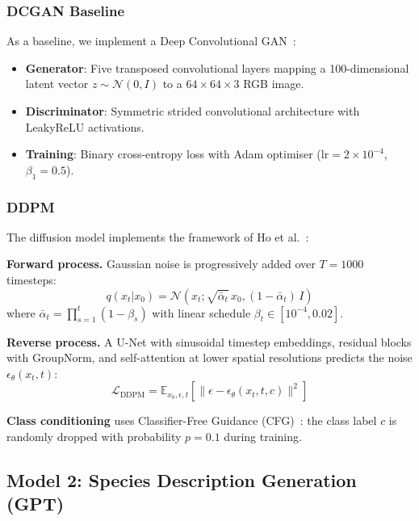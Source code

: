 \documentclass[12pt,a4paper]{article}
\begin{document}
\subsubsection{DCGAN Baseline}

As a baseline, we implement a Deep Convolutional GAN~\cite{radford2015unsupervised}:
\begin{itemize}
    \item \textbf{Generator}: Five transposed convolutional layers mapping a 100-dimensional latent vector $z \sim \mathcal{N}(0, I)$ to a $64 \times 64 \times 3$ RGB image.
    \item \textbf{Discriminator}: Symmetric strided convolutional architecture with LeakyReLU activations.
    \item \textbf{Training}: Binary cross-entropy loss with Adam optimiser ($\text{lr}=2\times10^{-4}$, $\beta_1=0.5$).
\end{itemize}

\subsubsection{DDPM}

The diffusion model implements the framework of Ho et al.~\cite{ho2020denoising}:

\textbf{Forward process.} Gaussian noise is progressively added over $T=1000$ timesteps:
\begin{equation}
    q(x_t | x_0) = \mathcal{N}(x_t; \sqrt{\bar{\alpha}_t}\, x_0, (1-\bar{\alpha}_t)\, I)
\end{equation}
where $\bar{\alpha}_t = \prod_{s=1}^{t}(1 - \beta_s)$ with linear schedule $\beta_t \in [10^{-4}, 0.02]$.

\textbf{Reverse process.} A U-Net with sinusoidal timestep embeddings, residual blocks with GroupNorm, and self-attention at lower spatial resolutions predicts the noise $\epsilon_\theta(x_t, t)$:
\begin{equation}
    \mathcal{L}_{\text{DDPM}} = \mathbb{E}_{x_0, \epsilon, t}\left[\| \epsilon - \epsilon_\theta(x_t, t, c) \|^2\right]
\end{equation}

\textbf{Class conditioning} uses Classifier-Free Guidance (CFG)~\cite{ho2022classifier}: the class label $c$ is randomly dropped with probability $p=0.1$ during training.

\subsection{Model 2: Species Description Generation (GPT)}
\end{document}
